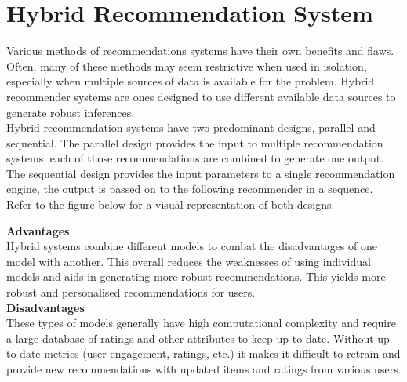 \section{Hybrid Recommendation System}
Various methods of recommendations systems have their own benefits and flaws. Often, many of these methods may seem restrictive when used in isolation, especially when multiple sources of data is available for the problem. Hybrid recommender systems are ones designed to use different available data sources to generate robust inferences.
\\Hybrid recommendation systems have two predominant designs, parallel and sequential. The parallel design provides the input to multiple recommendation systems, each of those recommendations are combined to generate one output. The sequential design provides the input parameters to a single recommendation engine, the output is passed on to the following recommender in a sequence. Refer to the figure below for a visual representation of both designs.

\textbf{Advantages}
\\Hybrid systems combine different models to combat the disadvantages of one model with another. This overall reduces the weaknesses of using individual models and aids in generating more robust recommendations. This yields more robust and personalised recommendations for users.
\\\textbf{Disadvantages}
\\These types of models generally have high computational complexity and require a large database of ratings and other attributes to keep up to date. Without up to date metrics (user engagement, ratings, etc.) it makes it difficult to retrain and provide new recommendations with updated items and ratings from various users.

